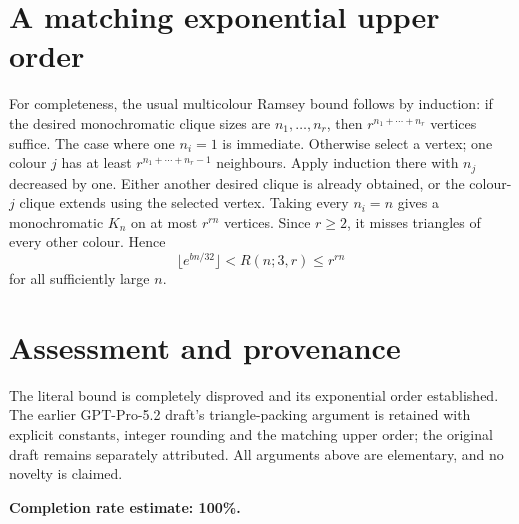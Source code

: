 \documentclass[11pt]{article}
\begin{document}
\section*{A matching exponential upper order}
For completeness, the usual multicolour Ramsey bound follows by induction: if the desired monochromatic clique sizes are $n_1,\ldots,n_r$, then $r^{n_1+\cdots+n_r}$ vertices suffice. The case where one $n_i=1$ is immediate. Otherwise select a vertex; one colour $j$ has at least $r^{n_1+\cdots+n_r-1}$ neighbours. Apply induction there with $n_j$ decreased by one. Either another desired clique is already obtained, or the colour-$j$ clique extends using the selected vertex.
Taking every $n_i=n$ gives a monochromatic $K_n$ on at most $r^{rn}$ vertices. Since $r\ge2$, it misses triangles of every other colour. Hence
\[
 \lfloor e^{bn/32}\rfloor<R(n;3,r)\le r^{rn}
\]
for all sufficiently large $n$.

\section*{Assessment and provenance}
The literal bound is completely disproved and its exponential order established. The earlier GPT-Pro-5.2 draft's triangle-packing argument is retained with explicit constants, integer rounding and the matching upper order; the original draft remains separately attributed. All arguments above are elementary, and no novelty is claimed.

\textbf{Completion rate estimate: 100\%.}
\end{document}
